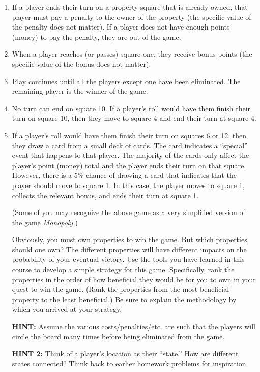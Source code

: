 \documentclass[fleqn]{article}
\begin{document}
\begin{enumerate}[nolistsep]
\begin{enumerate}
			\item If a player ends their turn on a property square that is already owned, that player must pay a penalty to the owner of the property (the specific value of the penalty does not matter). If a player does not have enough points (money) to pay the penalty, they are out of the game.
			
			\item When a player reaches (or passes) square one, they receive bonus points (the specific value of the bonus does not matter).

			\item Play continues until all the players except one have been eliminated. The remaining player is the winner of the game.

			\item No turn can end on square 10. If a player’s roll would have them finish their turn on square 10, then they move to square 4 and end their turn at square 4.

			\item If a player’s roll would have them finish their turn on squares 6 or 12, then they draw a card from a small deck of cards. The card indicates a “special” event that happens to that player. The majority of the cards only affect the player’s point (money) total and the player ends their turn on that square. However, there is a 5\% chance of drawing a card that indicates that the player should move to square 1. In this case, the player moves to square 1, collects the relevant bonus, and ends their turn at square 1.

			(Some of you may recognize the above game as a very simplified version of the game \textit{Monopoly.})

			Obviously, you must own properties to win the game. But which properties should one own? The different properties will have different impacts on the probability of your eventual victory. Use the tools you have learned in this course to develop a simple strategy for this game. Specifically, rank the properties in the order of how beneficial they would be for you to own in your quest to win the game. (Rank the properties from the most beneficial property to the least beneficial.) Be sure to explain the methodology by which you arrived at your strategy.
			
			\textbf{HINT:} Assume the various costs/penalties/etc. are such that the players will circle the board many times before being eliminated from the game.
			
			\textbf{HINT 2:} Think of a player’s location as their “state.” How are different states connected? Think back to earlier homework problems for inspiration.
			

\end{enumerate}
\end{enumerate}
\end{document}
